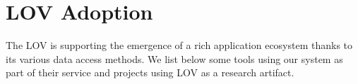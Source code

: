 \documentclass{iosart2c}
\begin{document}
\begin{description}
		
%							
%   
   
\end{description}


\section{LOV Adoption}
\label{sec:lovecosystem}
The LOV is supporting the emergence of a rich application ecosystem thanks to its various data access methods. We list below some tools using our system as part of their service and projects using LOV as a research artifact.
 
\end{document}
